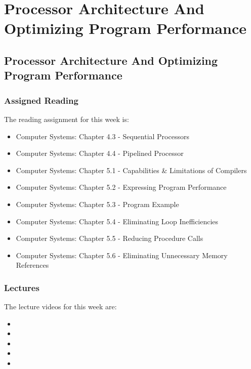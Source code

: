 \clearpage

\renewcommand{\ChapTitle}{Processor Architecture And Optimizing Program Performance}
\renewcommand{\SectionTitle}{Processor Architecture And Optimizing Program Performance}

\chapter{\ChapTitle}
\section{\SectionTitle}

\subsection{Assigned Reading}

The reading assignment for this week is:

\begin{itemize}
    \item Computer Systems: Chapter 4.3 - Sequential Processors
    \item Computer Systems: Chapter 4.4 - Pipelined Processor
    \item Computer Systems: Chapter 5.1 - Capabilities \& Limitations of Compilers
    \item Computer Systems: Chapter 5.2 - Expressing Program Performance
    \item Computer Systems: Chapter 5.3 - Program Example
    \item Computer Systems: Chapter 5.4 - Eliminating Loop Inefficiencies
    \item Computer Systems: Chapter 5.5 - Reducing Procedure Calls
    \item Computer Systems: Chapter 5.6 - Eliminating Unnecessary Memory References
\end{itemize}

\subsection{Lectures}

The lecture videos for this week are:

\begin{itemize}
    \item {}
    \item {}
    \item {}
    \item {}
    \item {}
\end{itemize}

